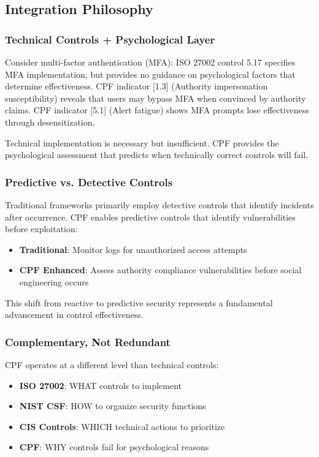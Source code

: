 \documentclass[11pt,a4paper]{article}
\begin{document}
\subsection{Integration Philosophy}

\subsubsection{Technical Controls + Psychological Layer}

Consider multi-factor authentication (MFA): ISO 27002 control 5.17 specifies MFA implementation, but provides no guidance on psychological factors that determine effectiveness. CPF indicator [1.3] (Authority impersonation susceptibility) reveals that users may bypass MFA when convinced by authority claims. CPF indicator [5.1] (Alert fatigue) shows MFA prompts lose effectiveness through desensitization.

Technical implementation is necessary but insufficient. CPF provides the psychological assessment that predicts when technically correct controls will fail.

\subsubsection{Predictive vs. Detective Controls}

Traditional frameworks primarily employ detective controls that identify incidents after occurrence. CPF enables predictive controls that identify vulnerabilities before exploitation:

\begin{itemize}
\item \textbf{Traditional}: Monitor logs for unauthorized access attempts
\item \textbf{CPF Enhanced}: Assess authority compliance vulnerabilities before social engineering occurs
\end{itemize}

This shift from reactive to predictive security represents a fundamental advancement in control effectiveness.

\subsubsection{Complementary, Not Redundant}

CPF operates at a different level than technical controls:

\begin{itemize}
\item \textbf{ISO 27002}: WHAT controls to implement
\item \textbf{NIST CSF}: HOW to organize security functions
\item \textbf{CIS Controls}: WHICH technical actions to prioritize
\item \textbf{CPF}: WHY controls fail for psychological reasons
\end{itemize}
\end{document}
